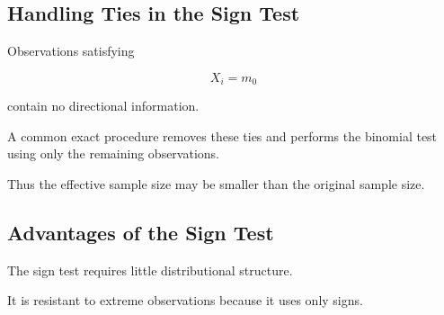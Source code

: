 
\subsection{Handling Ties in the Sign Test}
\label{subsec:sign-test-ties}

Observations satisfying

\[
X_i=m_0
\]

contain no directional information.

A common exact procedure removes these ties and performs the binomial test
using only the remaining observations.

Thus the effective sample size may be smaller than the original sample
size.

\subsection{Advantages of the Sign Test}
\label{subsec:sign-test-advantages}

The sign test requires little distributional structure.

It is resistant to extreme observations because it uses only signs.

